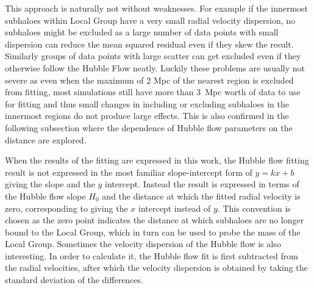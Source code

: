\documentclass[english, oneside]{HYgradu}
\begin{document}
This approach is naturally not without weaknesses. For example if the innermost subhaloes within Local Group have a very small radial velocity dispersion, no subhaloes might be excluded as a large number of data points with small dispersion can reduce the mean squared residual even if they skew the result. Similarly groups of data points with large scatter can get excluded even if they otherwise follow the Hubble Flow neatly. Luckily these problems are usually not severe as even when the maximum of 2 Mpc of the nearest region is excluded from fitting, most simulations still have more than 3~Mpc worth of data to use for fitting and thus small changes in including or excluding subhaloes in the innermost regions do not produce large effects. This is also confirmed in the following subsection where the dependence of Hubble flow parameters on the distance are explored.


When the results of the fitting are expressed in this work, the Hubble flow fitting result is not expressed in the most familiar slope-intercept form of $y = kx + b$ giving the slope and the $y$ intercept. Instead the result is expressed in terms of the Hubble flow slope $H_0$ and the distance at which the fitted radial velocity is zero, corresponding to giving the $x$ intercept instead of $y$. This convention is chosen as the zero point indicates the distance at which subhaloes are no longer bound to the Local Group, which in turn can be used to probe the mass of the Local Group. Sometimes the velocity dispersion of the Hubble flow is also interesting. In order to calculate it, the Hubble flow fit is first subtracted from the radial velocities, after which the velocity dispersion is obtained by taking the standard deviation of the differences.
\end{document}
